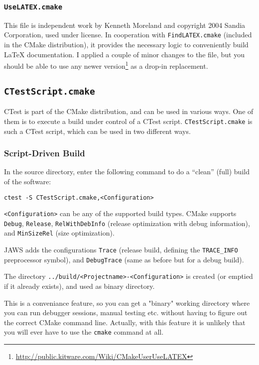 \subsubsection{\texttt{UseLATEX.cmake}}

This file is independent work by Kenneth Moreland and copyright 2004 Sandia Corporation, used under license. In cooperation with \lstinline{FindLATEX.cmake} (included in the CMake distribution), it provides the necessary logic to conveniently build \LaTeX{} documentation. I applied a couple of minor changes to the file, but you should be able to use any newer version\footnote{\url{http://public.kitware.com/Wiki/CMakeUserUseLATEX}} as a drop-in replacement.

\subsection{\texttt{CTestScript.cmake}}

CTest is part of the CMake distribution, and can be used in various ways. One of them is to execute a build under control of a CTest script. \lstinline{CTestScript.cmake} is such a CTest script, which can be used in two different ways.

\subsubsection{Script-Driven Build}

In the source directory, enter the following command to do a ``clean'' (full) build of the software:

\begin{lstlisting}
ctest -S CTestScript.cmake,<Configuration>
\end{lstlisting}

\lstinline{<Configuration>} can be any of the supported build types. CMake supports \lstinline{Debug}, \lstinline{Release}, \lstinline{RelWithDebInfo} (release optimization with debug information), and \lstinline{MinSizeRel} (size optimization).

JAWS adds the configurations \lstinline{Trace} (release build, defining the \lstinline{TRACE_INFO} preprocessor symbol), and \lstinline{DebugTrace} (same as before but for a debug build).

The directory \lstinline{../build/<Projectname>-<Configuration>} is created (or emptied if it already exists), and used as binary directory.

This is a conveniance feature, so you can get a "binary" working directory where you can run debugger sessions, manual testing etc. without having to figure out the correct CMake command line. Actually, with this feature it is unlikely that you will ever have to use the \lstinline{cmake} command at all.

